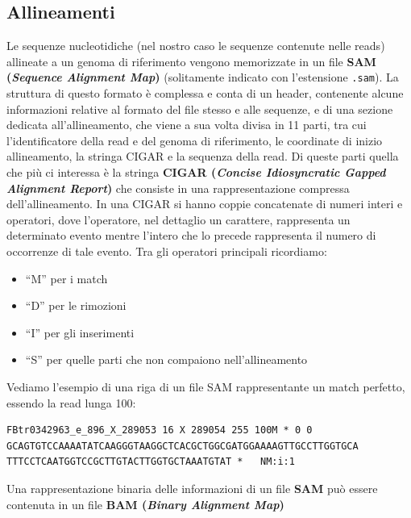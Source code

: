 \documentclass[a4paper,12pt, oneside]{book}
\begin{document}
\subsection{Allineamenti}
Le sequenze nucleotidiche (nel nostro caso le sequenze contenute nelle reads)
allineate a un genoma di riferimento vengono memorizzate in un file \textbf{SAM
  (\textit{Sequence Alignment Map})} \cite{sam} (solitamente indicato con
l'estensione \texttt{.sam}). La struttura di questo formato è complessa e conta
di un header, contenente alcune informazioni relative al formato del file stesso
e alle sequenze, e di una sezione dedicata all'allineamento, che viene a sua
volta divisa in 11 parti, tra cui l'identificatore della read e del genoma di
riferimento, le coordinate di inizio allineamento, la stringa CIGAR e la
sequenza della read. Di queste parti quella che più ci interessa è la stringa
\textbf{CIGAR (\textit{Concise Idiosyncratic Gapped Alignment Report})} che
consiste in una rappresentazione compressa dell'allineamento. In una CIGAR si
hanno coppie concatenate di numeri interi e operatori, dove l'operatore, nel
dettaglio un carattere, rappresenta un determinato evento mentre l'intero che lo
precede rappresenta il numero di occorrenze di tale evento. Tra gli operatori
principali ricordiamo: 
\begin{itemize}
  \item ``M'' per i match
  \item ``D'' per le rimozioni
  \item ``I'' per gli inserimenti
  \item ``S'' per quelle parti che non compaiono nell'allineamento
\end{itemize}
\begin{esempio}
  Vediamo l'esempio di una riga di un file SAM rappresentante un match perfetto,
  essendo la read lunga 100:
\begin{verbatim}
FBtr0342963_e_896_X_289053 16 X 289054 255 100M * 0 0	
GCAGTGTCCAAAATATCAAGGGTAAGGCTCACGCTGGCGATGGAAAAGTTGCCTTGGTGCA
TTTCCTCAATGGTCCGCTTGTACTTGGTGCTAAATGTAT	*	NM:i:1
\end{verbatim}
\end{esempio}
Una rappresentazione binaria delle informazioni di un file \textbf{SAM} può
essere contenuta in un file \textbf{BAM (\textit{Binary Alignment Map})}
\cite{sam} 
\end{document}
